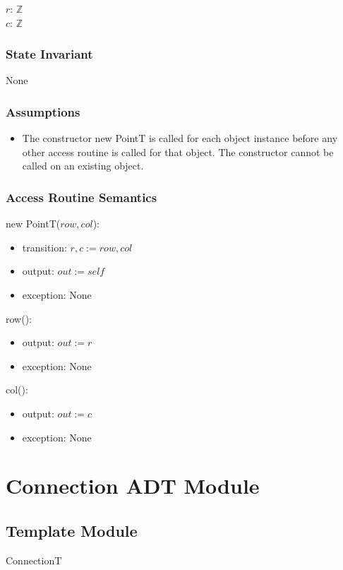 \documentclass[12pt]{article}
\begin{document}
$r$: $\mathbb{Z}$ \\
$c$: $\mathbb{Z}$

\subsubsection* {State Invariant}
None

\subsubsection* {Assumptions}
\begin{itemize}
    \item The constructor new PointT is called for each object instance before
    any other access routine is called for that object.  The constructor cannot
    be called on an existing object.
\end{itemize}

\subsubsection* {Access Routine Semantics}
new PointT($row, col$):
\begin{itemize}
    \item transition: $r, c := row, col$
    \item output: $out := \mathit{self}$
    \item exception: None
\end{itemize}

\noindent row():
\begin{itemize}
    \item output: $out := r$
    \item exception: None
\end{itemize}

\noindent col():
\begin{itemize}
    \item output: $out := c$
    \item exception: None
\end{itemize}



\newpage
\section* {Connection ADT Module}
\subsection*{Template Module}
ConnectionT
\end{document}
